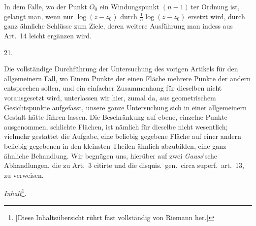 \documentclass[a4paper,12pt]{article}
\begin{document}
In dem Falle, wo der Punkt $O_0$ ein Windungspunkt $(n-1) \,$\-ter
Ordnung ist, gelangt man, wenn nur $\log (z - z_0)$ durch
$\displaystyle \frac{1}{n} \log (z - z_0)$ ersetzt wird, durch
ganz \"{a}hnliche Schl\"{u}sse zum Ziele, deren weitere
Ausf\"{u}hrung man indess aus Art.~14 leicht erg\"{a}nzen wird.

\medbreak

\centerline{21.}

\nobreak\medskip

Die vollst\"{a}ndige Durchf\"{u}hrung der Untersuchung des
vorigen Artikels f\"{u}r den allgemeinern Fall, wo Einem Punkte
der einen Fl\"{a}che mehrere Punkte der andern entsprechen
sollen, und ein einfacher Zusammenhang f\"{u}r dieselben nicht
vorausgesetzt wird, unterlassen wir hier, zumal da, aus
geometrischem Gesichtspunkte aufgefasst, unsere ganze
Untersuchung sich in einer allgemeinern Gestalt h\"{a}tte
f\"{u}hren lassen.  Die Beschr\"{a}nkung auf ebene, einzelne
Punkte ausgenommen, schlichte Fl\"{a}chen, ist n\"{a}mlich
f\"{u}r dieselbe nicht wesentlich; vielmehr gestattet die
Aufgabe, eine beliebig gegebene Fl\"{a}che auf einer andern
beliebig gegebenen in den kleinsten Theilen \"{a}hnlich
abzubilden, eine ganz \"{a}hnliche Behandlung.  Wir begn\"{u}gen
uns, hier\"{u}ber auf zwei \emph{Gauss}'sche Abhandlungen, die
zu Art.~3 citirte und die disquis.\ gen.\ circa superf.\ art.~13,
zu verweisen.

\vfill\eject

\centerline{\large\textit{Inhalt}\footnote{[Diese
Inhalts\"{u}bersicht r\"{u}hrt fast vollst\"{a}ndig von Riemann her.]}.}

\nobreak\medskip
\end{document}
